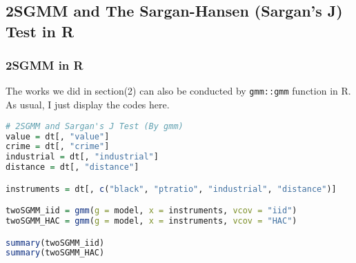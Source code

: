 \documentclass{article}
\theoremstyle{definition}
\begin{document}
\subsection{2SGMM and The Sargan-Hansen (Sargan's J) Test in R}

\subsubsection{2SGMM in R}
The works we did in section(2) can also be conducted by \texttt{gmm::gmm} function in R. As usual, I just display the codes here.

\begin{lstlisting}[language = R]
# 2SGMM and Sargan's J Test (By gmm)
value = dt[, "value"]
crime = dt[, "crime"]
industrial = dt[, "industrial"]
distance = dt[, "distance"]

instruments = dt[, c("black", "ptratio", "industrial", "distance")]

twoSGMM_iid = gmm(g = model, x = instruments, vcov = "iid")
twoSGMM_HAC = gmm(g = model, x = instruments, vcov = "HAC")

summary(twoSGMM_iid)
summary(twoSGMM_HAC)
\end{lstlisting}
\end{document}
